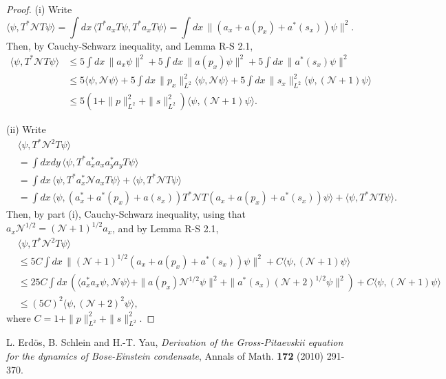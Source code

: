 \documentclass[a4paper,11pt]{article}
\newcommand{\N}{\mathcal{N}}
\begin{document}
\begin{proof}
  (i) Write
  \begin{displaymath}
    \langle \psi, T^* \N T \psi \rangle = \int dx \, \langle T^* a_x T \psi,
    T^* a_x T \psi \rangle = \int dx \, \| (a_x + a(p_x) + a^*(s_x)) \psi
    \|^2.
  \end{displaymath}
  Then, by Cauchy-Schwarz inequality, and Lemma R-S 2.1,
  \begin{align*}
    \langle \psi, T^* \N T \psi \rangle & \le 5 \int dx \, \| a_x \psi \|^2 +
    5 \int dx \, \| a(p_x) \psi \|^2 + 5 \int dx \, \| a^*(s_x) \psi \|^2 \\
    & \le 5 \langle \psi, \N \psi \rangle + 5 \int dx \, \| p_x \|_{L^2}^2
    \langle \psi, \N \psi \rangle + 5 \int dx \, \| s_x \|_{L^2}^2 \langle
    \psi, (\N+1) \psi \rangle \\
    & \le 5 (1 + \| p \|_{L^2}^2 + \| s \|_{L^2}^2) \langle \psi, (\N+1) \psi
    \rangle.
  \end{align*}


  (ii) Write
  \begin{align*}
    & \langle \psi, T^* \N^2 T \psi \rangle \\
    & = \int dxdy \, \langle \psi, T^* a_x^* a_x a_y^* a_y T \psi \rangle \\
    & = \int dx \, \langle \psi, T^* a_x^* \N a_x T \psi \rangle + \langle
    \psi, T^* \N T \psi \rangle \\
    & = \int dx \, \langle \psi, (a_x^* + a^*(p_x) + a(s_x)) T^* \N T (a_x +
    a(p_x) + a^*(s_x)) \psi \rangle + \langle \psi, T^* \N T \psi \rangle.
  \end{align*}
  Then, by part (i), Cauchy-Schwarz inequality, using that $a_x \N^{1/2} =
  (\N+1)^{1/2} a_x$, and by Lemma R-S 2.1,
  \begin{align*}
    & \langle \psi, T^* \N^2 T \psi \rangle \\
    & \le 5C \int dx \, \| (\N+1)^{1/2} (a_x + a(p_x) + a^*(s_x)) \psi \|^2 + C
    \langle \psi, (\N+1) \psi \rangle \\
    & \le 25C \int dx \, ( \langle a_x^* a_x \psi, \N \psi \rangle + \| a(p_x)
    \N^{1/2} \psi \|^2 + \| a^*(s_x) (\N+2)^{1/2} \psi \|^2 ) + C \langle
    \psi, (\N+1) \psi \rangle \\
    & \le (5C)^2 \langle \psi, (\N+2)^2 \psi \rangle,
  \end{align*}
  where $C = 1 + \| p \|_{L^2}^2 + \| s \|_{L^2}^2$.
\end{proof}


\begin{thebibliography}{99}
   L. Erd\"os, B. Schlein and H.-T. Yau, \emph{Derivation of the
    Gross-Pitaevskii equation for the dynamics of Bose-Einstein condensate},
    Annals of Math. {\bf 172} (2010) 291-370.
\end{thebibliography}
\end{document}
